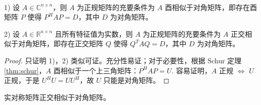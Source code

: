 \begin{theorem}[正规矩阵的充要条件]
\label{thm:unisim}
\ 

1) 设 $A\in\mathbb C^{n\times n}$，则 $A$ 为正规矩阵的充要条件为 $A$ 酉相似于对角矩阵，即存在酉矩阵 $P$ 使得 $P^HAP=D$，其中 $D$ 为对角矩阵。

2) 设 $A\in\mathbb R^{n\times n}$ 且所有特征值为实数，则 $A$ 为正规矩阵的充要条件为 $A$ 正交相似于对角矩阵，即存在正交矩阵 $Q$ 使得 $Q^TAQ=D$，其中 $D$ 为对角矩阵。
\end{theorem}
\begin{proof}
只证明 1)，2) 类似可证。充分性易证；对于必要性，根据 Schur 定理 \ref{thm:schur}，$A$ 酉相似于一个上三角矩阵：$P^HAP=U$. 容易证明，$A$ 正规 $\iff$ $U$ 正规，于是 $U^HU=UU^H$，故 $U$ 只能是对角矩阵。
\end{proof}

\begin{corollary}
实对称矩阵正交相似于对角矩阵。
\end{corollary}


